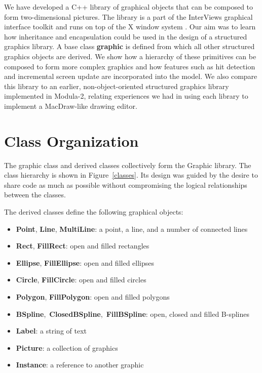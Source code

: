 We have developed a C++ \cite{c++} library of graphical objects that can be
composed to form two-dimensional pictures.  The library is a part of the
InterViews graphical interface toolkit \cite{interviews:impl} and runs on
top of the X window system \cite{x}.  Our aim was to learn how inheritance
and encapsulation could be used in the design of a structured graphics
library.  A base class {\bf graphic} is defined from which all other
structured graphics objects are derived. We show how a hierarchy of these
primitives can be composed to form more complex graphics and how features
such as hit detection and incremental screen update are incorporated into
the model.  We also compare this library to an earlier, non-object-oriented
structured graphics library implemented in \mbox{Modula-2}, relating
experiences we had in using each library to implement a MacDraw-like drawing
editor.

\section{Class Organization}

The graphic class and derived classes collectively form the Graphic library.
The class hierarchy is shown in Figure~\ref{classes}.
Its design was guided by the desire to share code as much as
possible without compromising the logical relationships between the classes.

\begin{figure*}
\vspace{3in}
\vspace{1ex}
\caption{Graphic library class hierarchy}
\label{classes}
\end{figure*}

The derived classes define the following graphical objects:

\begin{itemize}

\item {\bf Point}, {\bf Line}, {\bf MultiLine}: a point, a line, and a 
    number of connected lines
\item {\bf Rect}, {\bf FillRect}: open and filled rectangles
\item {\bf Ellipse}, {\bf FillEllipse}: open and filled ellipses
\item {\bf Circle}, {\bf FillCircle}: open and filled circles
\item {\bf Polygon}, {\bf FillPolygon}: open and filled polygons
\item {\bf BSpline},~{\bf ClosedBSpline},~{\bf FillBSpline}: open,
    closed and filled B-splines
\item {\bf Label}: a string of text
\item {\bf Picture}: a collection of graphics
\item {\bf Instance}: a reference to another graphic

\end{itemize}
	
